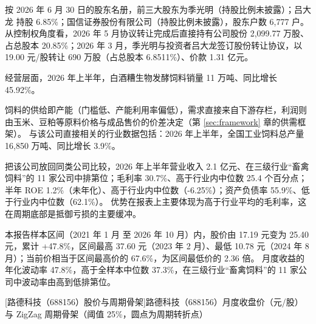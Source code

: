  按 2026 年 6 月 30 日的股东名册，前三大股东为季光明（持股比例未披露）；吕大龙 持股 6.85\%；国信证券股份有限公司（持股比例未披露），股东户数 6,777 户。 从控制权角度看，2026 年 5 月协议转让完成后直接持有公司股份 2,099.77 万股、占总股本 20.85\%；2026 年 3 月，季光明与投资者吕大龙签订股份转让协议，以 19.00 元/股转让 690 万股（占总股本 6.8511\%）、价款 1.31 亿元。

 经营层面，2026 年上半年，白酒糟生物发酵饲料销量 11 万吨、同比增长 45.92\%。

 饲料的供给即产能（门槛低、产能利用率偏低），需求直接来自下游存栏，利润则由玉米、豆粕等原料价格与成品售价的价差决定（第 \ref{sec:framework} 章的供需框架）。 与该公司直接相关的行业数据包括：2026 年上半年，全国工业饲料总产量 16,850 万吨、同比增长 3.9\%。

 把该公司放回同类公司比较，2026 年上半年营业收入 2.1 亿元、在三级行业“畜禽饲料”的 11 家公司中排第位；毛利率 30.7\%、高于行业内中位数 25.4 个百分点；半年 ROE 1.2\%（未年化）、高于行业内中位数（-6.25\%）；资产负债率 55.9\%、低于行业内中位数（62.1\%）。 优势在报表上主要体现为高于行业平均的毛利率，这在周期底部是抵御亏损的主要缓冲。

 本报告样本区间（2021 年 1 月 至 2026 年 10 月）内，股价由 17.19 元变为 25.40 元，累计 +47.8\%，区间最高 37.60 元（2023 年 2 月）、最低 10.78 元（2024 年 8 月）；当前价相当于区间最高价的 67.6\%，为区间最低价的 2.36 倍。 月度收益的年化波动率 47.8\%，高于全样本中位数 37.3\%，在三级行业“畜禽饲料”的 11 家公司中波动率由高到低排第位。

\begin{center}
\begin{minipage}{\textwidth}\centering
{}

[路德科技（688156）股价与周期骨架]{路德科技（688156）月度收盘价（元/股）与 ZigZag 周期骨架（阈值 25\%，圆点为周期转折点）}
\end{minipage}
\end{center}

